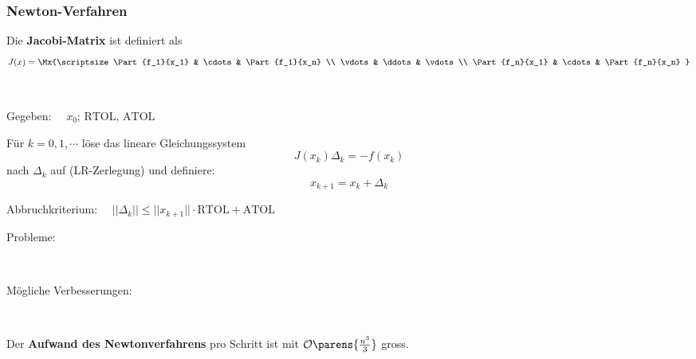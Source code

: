 		\subsubsection{Newton-Verfahren}
			Die \textbf{Jacobi-Matrix} ist definiert als
			\[
				J(x) = \Mx{\scriptsize
					\Part{f_1}{x_1} & \cdots & \Part{f_1}{x_n} \\
					\vdots & \ddots & \vdots \\
					\Part{f_n}{x_1} & \cdots & \Part{f_n}{x_n}
				}
			\]

			\begin{algo} ~

				Gegeben: $\quad x_0;\, \mathrm{RTOL},\, \mathrm{ATOL}$

				Für $k=0,1,\cdots$ löse das lineare Gleichungssystem
				\[
					J(x_k) \Delta_k = -f(x_k)
				\]
				nach $\Delta_k$ auf (LR-Zerlegung) und definiere:
				\[
					x_{k+1} = x_k + \Delta_k
				\]

				Abbruchkriterium: $\quad ||\Delta_k|| \leq ||x_{k+1}||\cdot \mathrm{RTOL} + \mathrm{ATOL}$
			\end{algo}

			\begin{description}
				\item[Probleme:] ~
				\item[Mögliche Verbesserungen:] ~
			\end{description}
			Der \textbf{Aufwand des Newtonverfahrens} pro Schritt ist mit $\mathcal{O}\parens{\frac{n^3}{3}}$ gross.

